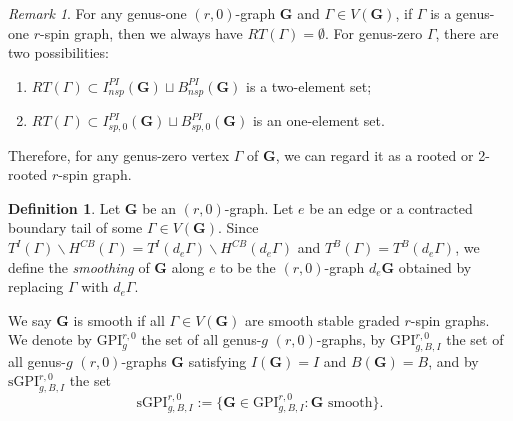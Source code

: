 \documentclass[11pt]{amsart}
\theoremstyle{definition}
\newtheorem{dfn}[dummy]{Definition}
\theoremstyle{remark}
\newtheorem{rmk}[dummy]{Remark}
\newcommand{\<}{\left<}
\renewcommand{\>}{\right>}
\numberwithin{equation}{section}
\def\GPI{{\text{GPI}}}
\def\sGPI{\text{sGPI}}
\begin{document}
\begin{rmk}\label{rmk root for vertex of PI graph}
    For any genus-one $(r,0)$-graph $\mathbf{G}$ and $\Gamma\in V(\mathbf{G})$, if $\Gamma$ is a genus-one $r$-spin graph, then we always have $RT(\Gamma)=\emptyset$. For genus-zero $\Gamma$, there are two possibilities:
    \begin{enumerate}
        \item $RT(\Gamma)\subset I^{PI}_{nsp}(\mathbf{G})\sqcup B^{PI}_{nsp}(\mathbf{G})$ is a two-element set;
        \item $RT(\Gamma)\subset I^{PI}_{sp,0}(\mathbf{G})\sqcup B^{PI}_{sp,0}(\mathbf{G})$ is an one-element set.
    \end{enumerate}
    Therefore, for any genus-zero vertex $\Gamma$ of $\mathbf{G}$, we can regard it as a rooted or 2-rooted $r$-spin graph.
\end{rmk}




\begin{dfn}
Let $\mathbf{G}$ be an $(r,0)$-graph. Let $e$ be an edge or a contracted boundary tail of %
some $\Gamma\in V(\mathbf{G})$. %
Since $T^I(\Gamma)\backslash H^{CB}(\Gamma)=T^I(d_e \Gamma)\backslash H^{CB}(d_e \Gamma)$ and %
$T^B(\Gamma)=T^B(d_e \Gamma)$, we define the \textit{smoothing} of $\mathbf{G}$ along $e$ to be the $(r,0)$-graph $d_e \mathbf{G}$ obtained by replacing $\Gamma$ with $d_e \Gamma$.


We say $\mathbf{G}$ is smooth if all $\Gamma\in V(\mathbf{G})$ are smooth stable graded $r$-spin graphs.
We denote by $\GPI^{r,0}_g$ the set of all genus-$g$ $(r,0)$-graphs, by $\GPI^{r,0}_{g,B,I}$ the set of all genus-$g$ $(r,0)$-graphs $\mathbf{G}$ satisfying $I(\mathbf{G})=I$ and %
$B(\mathbf{G})=B$, and  by %
$\sGPI^{r,0}_{g,B,I}$ the set 
$$ 
\sGPI^{r,0}_{g,B,I}:=\{\mathbf{G}\in \GPI^{r,0}_{g,B,I}\colon \mathbf{G}\text{ smooth}\}.
$$
\end{dfn}
\end{document}
